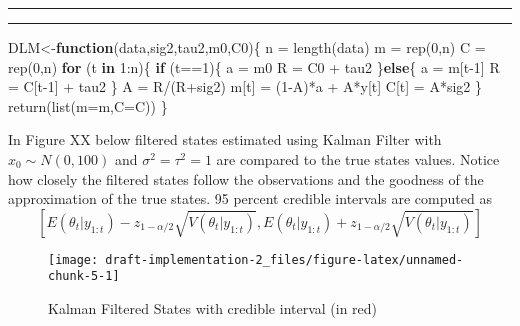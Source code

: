 \documentclass[
]{article}
\newenvironment{Shaded}{\begin{snugshade}}{\end{snugshade}}
\newcommand{\AttributeTok}[1]{\textcolor[rgb]{0.77,0.63,0.00}{#1}}
\newcommand{\ControlFlowTok}[1]{\textcolor[rgb]{0.13,0.29,0.53}{\textbf{#1}}}
\newcommand{\DecValTok}[1]{\textcolor[rgb]{0.00,0.00,0.81}{#1}}
\newcommand{\FunctionTok}[1]{\textcolor[rgb]{0.00,0.00,0.00}{#1}}
\newcommand{\NormalTok}[1]{#1}
\newcommand{\OtherTok}[1]{\textcolor[rgb]{0.56,0.35,0.01}{#1}}
\newcommand{\SpecialCharTok}[1]{\textcolor[rgb]{0.00,0.00,0.00}{#1}}
\begin{document}
\hrule
\hrule

\begin{Shaded}
\begin{Highlighting}[]
\NormalTok{DLM}\OtherTok{\textless{}{-}}\ControlFlowTok{function}\NormalTok{(data,sig2,tau2,m0,C0)\{}
\NormalTok{  n  }\OtherTok{=} \FunctionTok{length}\NormalTok{(data)}
\NormalTok{  m  }\OtherTok{=} \FunctionTok{rep}\NormalTok{(}\DecValTok{0}\NormalTok{,n)}
\NormalTok{  C  }\OtherTok{=} \FunctionTok{rep}\NormalTok{(}\DecValTok{0}\NormalTok{,n)}
  \ControlFlowTok{for}\NormalTok{ (t }\ControlFlowTok{in} \DecValTok{1}\SpecialCharTok{:}\NormalTok{n)\{}
    \ControlFlowTok{if}\NormalTok{ (t}\SpecialCharTok{==}\DecValTok{1}\NormalTok{)\{}
\NormalTok{      a }\OtherTok{=}\NormalTok{ m0}
\NormalTok{      R }\OtherTok{=}\NormalTok{ C0 }\SpecialCharTok{+}\NormalTok{ tau2}
\NormalTok{    \}}\ControlFlowTok{else}\NormalTok{\{}
\NormalTok{      a }\OtherTok{=}\NormalTok{ m[t}\DecValTok{{-}1}\NormalTok{]}
\NormalTok{      R }\OtherTok{=}\NormalTok{ C[t}\DecValTok{{-}1}\NormalTok{] }\SpecialCharTok{+}\NormalTok{ tau2}
\NormalTok{    \}}
\NormalTok{    A }\OtherTok{=}\NormalTok{ R}\SpecialCharTok{/}\NormalTok{(R}\SpecialCharTok{+}\NormalTok{sig2)}
\NormalTok{    m[t] }\OtherTok{=}\NormalTok{ (}\DecValTok{1}\SpecialCharTok{{-}}\NormalTok{A)}\SpecialCharTok{*}\NormalTok{a }\SpecialCharTok{+}\NormalTok{ A}\SpecialCharTok{*}\NormalTok{y[t]}
\NormalTok{    C[t] }\OtherTok{=}\NormalTok{ A}\SpecialCharTok{*}\NormalTok{sig2}
\NormalTok{  \}}
  \FunctionTok{return}\NormalTok{(}\FunctionTok{list}\NormalTok{(}\AttributeTok{m=}\NormalTok{m,}\AttributeTok{C=}\NormalTok{C))}
\NormalTok{\}}
\end{Highlighting}
\end{Shaded}

In Figure XX below filtered states estimated using Kalman Filter with
\(x_{0} \sim N(0,100)\) and \(\sigma^{2}=\tau^{2}=1\) are compared to
the true states values. Notice how closely the filtered states follow
the observations and the goodness of the approximation of the true
states. 95 percent credible intervals are computed as
\[[E(\theta_{t}|y_{1:t})-z_{1-\alpha/2}\sqrt{V(\theta_{t}|y_{1:t})},E(\theta_{t}|y_{1:t})+z_{1-\alpha/2}\sqrt{V(\theta_{t}|y_{1:t})}]\]

\begin{figure}[ht]

{\centering \texttt{[image: draft-implementation-2\_files/figure-latex/unnamed-chunk-5-1]} 

}

\caption{Kalman Filtered States with credible interval (in red)}\label{fig:unnamed-chunk-5}
\end{figure}
\end{document}
